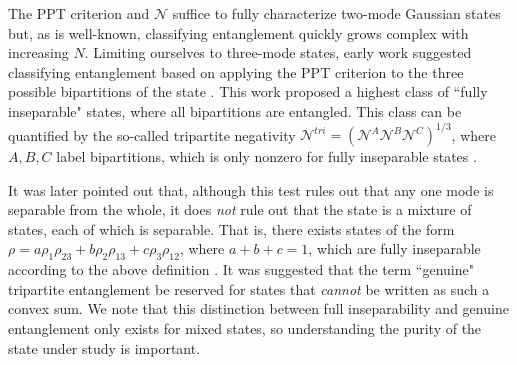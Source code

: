 \documentclass[prl,10pt,twocolumn,superscriptaddress,notitlepage,floatfix,amssymb]{revtex4}
\begin{document}

The PPT criterion and $\mathcal{N}$ suffice to fully characterize two-mode Gaussian states but, as is well-known, classifying entanglement quickly grows complex with increasing $N$. Limiting ourselves to three-mode states, early work suggested classifying entanglement based on applying the PPT criterion to the three possible bipartitions of the state \cite{Giedke:2001ey, vanLoock:2003hn}.  This work proposed a highest class of ``fully inseparable" states, where all bipartitions are entangled. This class can be quantified by the so-called tripartite negativity $\mathcal{N}^{tri} = (\mathcal{N}^{A} \mathcal{N}^{B} \mathcal{N}^{C})^{1/3}$, where ${A,B,C}$ label bipartitions, which is only nonzero for fully inseparable states \cite{Sabin:2008ce}.

It was later pointed out \cite{Teh:2014ij,Shchukin:2015ci,Gerke:2016hu} that, although this test rules out that any one mode is separable from the whole, it does \textit{not} rule out that the state is a mixture of states, each of which is separable. That is, there exists states of the form $\rho = a \rho_1 \rho_{23} + b \rho_2 \rho_{13} + c \rho_3 \rho_{12}$, where $a + b + c = 1$, which are fully inseparable according to the above definition \cite{Teh:2014ij}.  It was suggested that the term ``genuine" tripartite entanglement be reserved for states that \textit{cannot} be written as such a convex sum.  We note that this distinction between full inseparability and genuine entanglement only exists for mixed states, so understanding the purity of the state under study is important.
\end{document}
